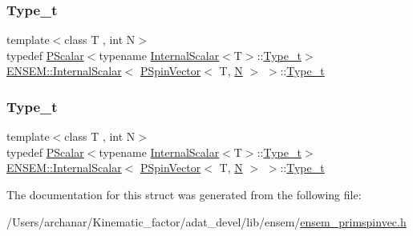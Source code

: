 \subsubsection{\texorpdfstring{Type\_t}{Type\_t}\hspace{0.1cm}{\footnotesize\ttfamily [1/2]}}
{\footnotesize\ttfamily template$<$class T , int N$>$ \\
typedef \mbox{\hyperlink{classENSEM_1_1PScalar}{P\+Scalar}}$<$typename \mbox{\hyperlink{structENSEM_1_1InternalScalar}{Internal\+Scalar}}$<$T$>$\+::\mbox{\hyperlink{structENSEM_1_1InternalScalar_3_01PSpinVector_3_01T_00_01N_01_4_01_4_a65d7d95d2a184abe920b5589a148ce04}{Type\+\_\+t}}$>$ \mbox{\hyperlink{structENSEM_1_1InternalScalar}{E\+N\+S\+E\+M\+::\+Internal\+Scalar}}$<$ \mbox{\hyperlink{classENSEM_1_1PSpinVector}{P\+Spin\+Vector}}$<$ T, \mbox{\hyperlink{operator__name__util_8cc_a7722c8ecbb62d99aee7ce68b1752f337}{N}} $>$ $>$\+::\mbox{\hyperlink{structENSEM_1_1InternalScalar_3_01PSpinVector_3_01T_00_01N_01_4_01_4_a65d7d95d2a184abe920b5589a148ce04}{Type\+\_\+t}}}

\mbox{\label{structENSEM_1_1InternalScalar_3_01PSpinVector_3_01T_00_01N_01_4_01_4_a65d7d95d2a184abe920b5589a148ce04}} 
\subsubsection{\texorpdfstring{Type\_t}{Type\_t}\hspace{0.1cm}{\footnotesize\ttfamily [2/2]}}
{\footnotesize\ttfamily template$<$class T , int N$>$ \\
typedef \mbox{\hyperlink{classENSEM_1_1PScalar}{P\+Scalar}}$<$typename \mbox{\hyperlink{structENSEM_1_1InternalScalar}{Internal\+Scalar}}$<$T$>$\+::\mbox{\hyperlink{structENSEM_1_1InternalScalar_3_01PSpinVector_3_01T_00_01N_01_4_01_4_a65d7d95d2a184abe920b5589a148ce04}{Type\+\_\+t}}$>$ \mbox{\hyperlink{structENSEM_1_1InternalScalar}{E\+N\+S\+E\+M\+::\+Internal\+Scalar}}$<$ \mbox{\hyperlink{classENSEM_1_1PSpinVector}{P\+Spin\+Vector}}$<$ T, \mbox{\hyperlink{operator__name__util_8cc_a7722c8ecbb62d99aee7ce68b1752f337}{N}} $>$ $>$\+::\mbox{\hyperlink{structENSEM_1_1InternalScalar_3_01PSpinVector_3_01T_00_01N_01_4_01_4_a65d7d95d2a184abe920b5589a148ce04}{Type\+\_\+t}}}



The documentation for this struct was generated from the following file\+:\begin{DoxyCompactItemize}
\item 
/\+Users/archanar/\+Kinematic\+\_\+factor/adat\+\_\+devel/lib/ensem/\mbox{\hyperlink{lib_2ensem_2ensem__primspinvec_8h}{ensem\+\_\+primspinvec.\+h}}\end{DoxyCompactItemize}

